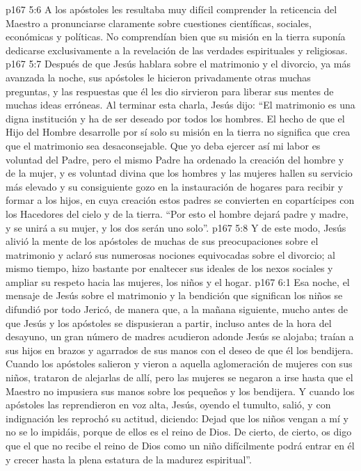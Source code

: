\vs p167 5:6 A los apóstoles les resultaba muy difícil comprender la reticencia del Maestro a pronunciarse claramente sobre cuestiones científicas, sociales, económicas y políticas. No comprendían bien que su misión en la tierra suponía dedicarse exclusivamente a la revelación de las verdades espirituales y religiosas.
\vs p167 5:7 Después de que Jesús hablara sobre el matrimonio y el divorcio, ya más avanzada la noche, sus apóstoles le hicieron privadamente otras muchas preguntas, y las respuestas que él les dio sirvieron para liberar sus mentes de muchas ideas erróneas. Al terminar esta charla, Jesús dijo: “El matrimonio es una digna institución y ha de ser deseado por todos los hombres. El hecho de que el Hijo del Hombre desarrolle por sí solo su misión en la tierra no significa que crea que el matrimonio sea desaconsejable. Que yo deba ejercer así mi labor es voluntad del Padre, pero el mismo Padre ha ordenado la creación del hombre y de la mujer, y es voluntad divina que los hombres y las mujeres hallen su servicio más elevado y su consiguiente gozo en la instauración de hogares para recibir y formar a los hijos, en cuya creación estos padres se convierten en copartícipes con los Hacedores del cielo y de la tierra. “Por esto el hombre dejará padre y madre, y se unirá a su mujer, y los dos serán uno solo”.
\vs p167 5:8 Y de este modo, Jesús alivió la mente de los apóstoles de muchas de sus preocupaciones sobre el matrimonio y aclaró sus numerosas nociones equivocadas sobre el divorcio; al mismo tiempo, hizo bastante por enaltecer sus ideales de los nexos sociales y ampliar su respeto hacia las mujeres, los niños y el hogar.
\vs p167 6:1 Esa noche, el mensaje de Jesús sobre el matrimonio y la bendición que significan los niños se difundió por todo Jericó, de manera que, a la mañana siguiente, mucho antes de que Jesús y los apóstoles se dispusieran a partir, incluso antes de la hora del desayuno, un gran número de madres acudieron adonde Jesús se alojaba; traían a sus hijos en brazos y agarrados de sus manos con el deseo de que él los bendijera. Cuando los apóstoles salieron y vieron a aquella aglomeración de mujeres con sus niños, trataron de alejarlas de allí, pero las mujeres se negaron a irse hasta que el Maestro no impusiera sus manos sobre los pequeños y los bendijera. Y cuando los apóstoles las reprendieron en voz alta, Jesús, oyendo el tumulto, salió, y con indignación les reprochó su actitud, diciendo: Dejad que los niños vengan a mí y no se lo impidáis, porque de ellos es el reino de Dios. De cierto, de cierto, os digo que el que no recibe el reino de Dios como un niño difícilmente podrá entrar en él y crecer hasta la plena estatura de la madurez espiritual”.
